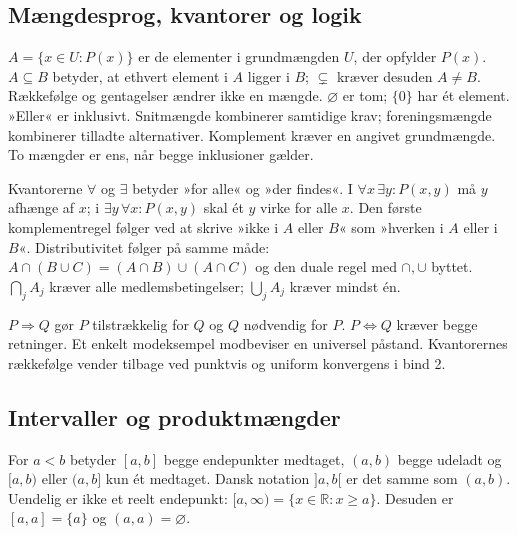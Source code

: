\subsection{Mængdesprog, kvantorer og logik}
\label{sec:maengdenotation}
$A=\{x\in U:P(x)\}$ er de elementer i grundmængden $U$, der opfylder
$P(x)$. $A\subseteq B$ betyder, at ethvert element i $A$ ligger i $B$;
$\subsetneq$ kræver desuden $A\ne B$. Rækkefølge og gentagelser ændrer ikke
en mængde. $\varnothing$ er tom; $\{0\}$ har ét element.
»Eller« er inklusivt. Snitmængde kombinerer samtidige krav;
foreningsmængde kombinerer tilladte alternativer. Komplement kræver en
angivet grundmængde. To mængder er ens, når begge inklusioner gælder.

Kvantorerne $\forall$ og $\exists$ betyder »for alle« og »der findes«.
I $\forall x\,\exists y:P(x,y)$ må $y$ afhænge af $x$; i
$\exists y\,\forall x:P(x,y)$ skal ét $y$ virke for alle $x$.
Den første komplementregel følger ved at skrive »ikke i $A$ eller $B$«
som »hverken i $A$ eller i $B$«. Distributivitet følger på samme måde:
$A\cap(B\cup C)=(A\cap B)\cup(A\cap C)$ og den duale regel med
$\cap,\cup$ byttet. $\bigcap_j A_j$ kræver alle medlemsbetingelser;
$\bigcup_j A_j$ kræver mindst én.

$P\Rightarrow Q$ gør $P$ tilstrækkelig for $Q$ og $Q$ nødvendig for $P$.
$P\Leftrightarrow Q$ kræver begge retninger. Et enkelt modeksempel
modbeviser en universel påstand. Kvantorernes rækkefølge vender tilbage
ved punktvis og uniform konvergens i bind 2.

\subsection{Intervaller og produktmængder}
\label{sec:intervaller}
For $a<b$ betyder $[a,b]$ begge endepunkter medtaget, $(a,b)$ begge
udeladt og $[a,b)$ eller $(a,b]$ kun ét medtaget. Dansk notation $]a,b[$
er det samme som $(a,b)$. Uendelig er ikke et reelt endepunkt:
$[a,\infty)=\{x\in\mathbb R:x\ge a\}$. Desuden er $[a,a]=\{a\}$ og
$(a,a)=\varnothing$.

